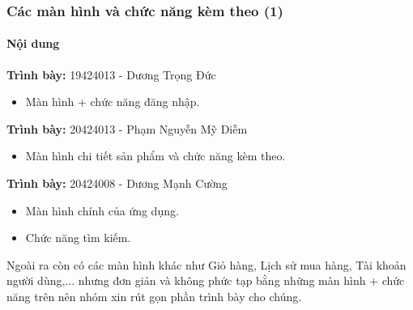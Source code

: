 \documentclass{beamer}
\begin{document}
\begin{frame}
    \frametitle{Các màn hình và chức năng kèm theo (1)}
    \framesubtitle{Nội dung}
    \begin{flushleft}
        \large{\textbf{Trình bày: } 19424013 - Dương Trọng Đức}
        \begin{itemize}
            \item Màn hình + chức năng đăng nhập.
        \end{itemize}
    \end{flushleft}

    \begin{flushleft}
        \large{\textbf{Trình bày: } 20424013 - Phạm Nguyễn Mỹ Diễm}
        \begin{itemize}
            \item Màn hình chi tiết sản phẩm và chức năng kèm theo.
        \end{itemize}
    \end{flushleft}

    \begin{flushleft}
        \large{\textbf{Trình bày: } 20424008 - Dương Mạnh Cường}
        \begin{itemize}
            \item Màn hình chính của ứng dụng.
            \item Chức năng tìm kiếm.
        \end{itemize}
    \end{flushleft}

    \begin{flushleft}
        Ngoài ra còn có các màn hình khác như \textsf{\color{teal} Giỏ hàng, Lịch sử mua hàng, Tài khoản người dùng,...} nhưng đơn giản và không phức tạp bằng những màn hình + chức năng trên nên nhóm xin rút gọn phần trình bày cho chúng.
    \end{flushleft}
\end{frame}
\end{document}
